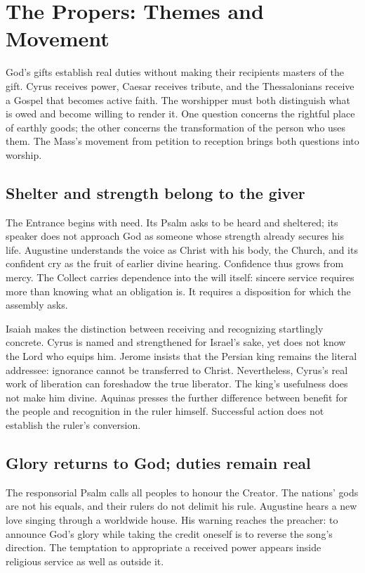 \clearpage
\section{The Propers: Themes and Movement}
God's gifts establish real duties without making their recipients masters of the gift. Cyrus receives power, Caesar receives tribute, and the Thessalonians receive a Gospel that becomes active faith. The worshipper must both distinguish what is owed and become willing to render it. One question concerns the rightful place of earthly goods; the other concerns the transformation of the person who uses them. The Mass's movement from petition to reception brings both questions into worship.

\subsection{Shelter and strength belong to the giver}
The Entrance begins with need. Its Psalm asks to be heard and sheltered; its speaker does not approach God as someone whose strength already secures his life. Augustine understands the voice as Christ with his body, the Church, and its confident cry as the fruit of earlier divine hearing. Confidence thus grows from mercy. The Collect carries dependence into the will itself: sincere service requires more than knowing what an obligation is. It requires a disposition for which the assembly asks.

Isaiah makes the distinction between receiving and recognizing startlingly concrete. Cyrus is named and strengthened for Israel's sake, yet does not know the Lord who equips him. Jerome insists that the Persian king remains the literal addressee: ignorance cannot be transferred to Christ. Nevertheless, Cyrus's real work of liberation can foreshadow the true liberator. The king's usefulness does not make him divine. Aquinas presses the further difference between benefit for the people and recognition in the ruler himself. Successful action does not establish the ruler's conversion.

\subsection{Glory returns to God; duties remain real}
The responsorial Psalm calls all peoples to honour the Creator. The nations' gods are not his equals, and their rulers do not delimit his rule. Augustine hears a new love singing through a worldwide house. His warning reaches the preacher: to announce God's glory while taking the credit oneself is to reverse the song's direction. The temptation to appropriate a received power appears inside religious service as well as outside it.

